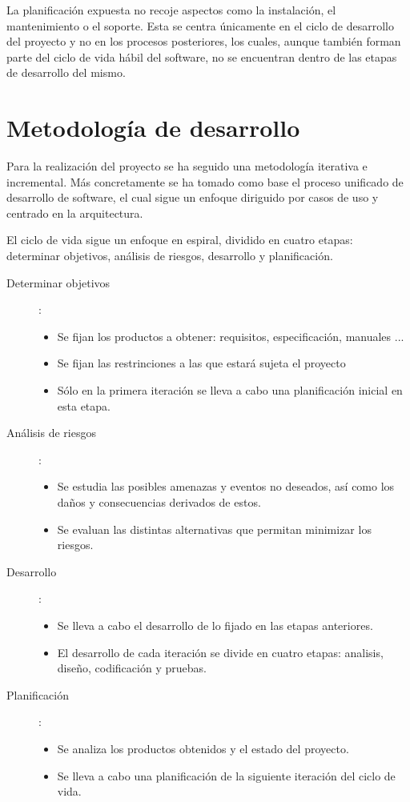 La planificación expuesta no recoje aspectos como la instalación, el mantenimiento o el soporte. Esta se centra únicamente en el ciclo de desarrollo
del proyecto y no en los procesos posteriores, los cuales, aunque también forman parte del ciclo de vida hábil del software, no se encuentran dentro de 
las etapas de desarrollo del mismo.

\section{Metodología de desarrollo}

Para la realización del proyecto se ha seguido una metodología iterativa e incremental. Más concretamente se ha tomado como
base el proceso unificado de desarrollo de software, el cual sigue un enfoque diriguido por casos de uso y centrado en 
la arquitectura. 

El ciclo de vida sigue un enfoque en espiral, dividido en cuatro etapas: determinar objetivos, análisis de riesgos, desarrollo y planificación.

\begin{description}
\item[Determinar objetivos]: 
   \begin {itemize}
   \item Se fijan los productos a obtener: requisitos, especificación, manuales ...
   \item Se fijan las restrinciones a las que estará sujeta el proyecto
   \item Sólo en la primera iteración se lleva a cabo una planificación inicial en esta etapa.
   \end{itemize}
\item[Análisis de riesgos]: 
   \begin {itemize}
   \item Se estudia las posibles amenazas y eventos no deseados, así como los daños y consecuencias derivados de estos.
   \item Se evaluan las distintas alternativas que permitan minimizar los riesgos.
   \end{itemize}
\item[Desarrollo]: 
   \begin {itemize}
   \item Se lleva a cabo el desarrollo de lo fijado en las etapas anteriores.
   \item El desarrollo de cada iteración se divide en cuatro etapas: analisis, diseño, codificación y pruebas.
   \end{itemize}
\item[Planificación]:
   \begin {itemize}
   \item Se analiza los productos obtenidos y el estado del proyecto.
   \item Se lleva a cabo una planificación de la siguiente iteración del ciclo de vida.
   \end{itemize}
\end{description}

